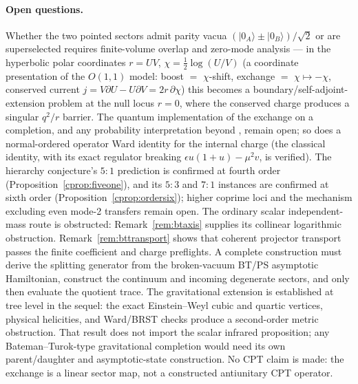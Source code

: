 \documentclass[11pt]{article}
\theoremstyle{definition}
\theoremstyle{remark}
\begin{document}
\paragraph{Open questions.}
Whether the two pointed sectors admit parity vacua
$(|0_A\rangle\pm|0_B\rangle)/\sqrt2$ or are superselected requires
finite-volume overlap and zero-mode analysis --- in the hyperbolic
polar coordinates $r=UV$, $\chi=\tfrac12\log(U/V)$ (a coordinate
presentation of the $O(1,1)$ model: boost $=$ $\chi$-shift, exchange
$=$ $\chi\mapsto-\chi$, conserved current $j=V\partial U-U\partial V
=2r\,\partial\chi$) this becomes a boundary/self-adjoint-extension
problem at the null locus $r=0$, where the conserved charge produces a
singular $q^2/r$ barrier.  The quantum implementation of the exchange
on a completion, and any probability interpretation beyond
\cite{BT2026}, remain open; so does a normal-ordered operator Ward
identity for the internal charge (the classical identity, with its
exact regulator breaking $\epsilon u(1+u)-\mu^2v$, is verified).  The
hierarchy conjecture's $5{:}1$ prediction is confirmed at fourth order
(Proposition~\ref{cprop:fiveone}), and its $5{:}3$ and $7{:}1$ instances are
confirmed at sixth order (Proposition~\ref{cprop:ordersix}); higher coprime
loci and the mechanism excluding even mode-2 transfers remain open.
The ordinary scalar independent-mass route is obstructed:
Remark~\ref{rem:btaxis} supplies its collinear logarithmic
obstruction.  Remark~\ref{rem:bttransport} shows that coherent projector
transport passes the finite coefficient and charge preflights.  A complete
construction must derive the splitting generator from the broken-vacuum BT/PS
asymptotic Hamiltonian, construct the continuum and incoming degenerate
sectors, and only then evaluate the quotient trace.  The
gravitational extension is established at tree level in the sequel: the exact
Einstein--Weyl cubic and quartic vertices, physical
helicities, and Ward/BRST checks produce a second-order metric obstruction.
That result does not import the scalar infrared proposition; any
Bateman--Turok-type gravitational completion would need its own
parent/daughter and asymptotic-state construction.  No CPT claim is made: the
exchange is a linear sector map, not a constructed antiunitary CPT operator.
\end{document}
